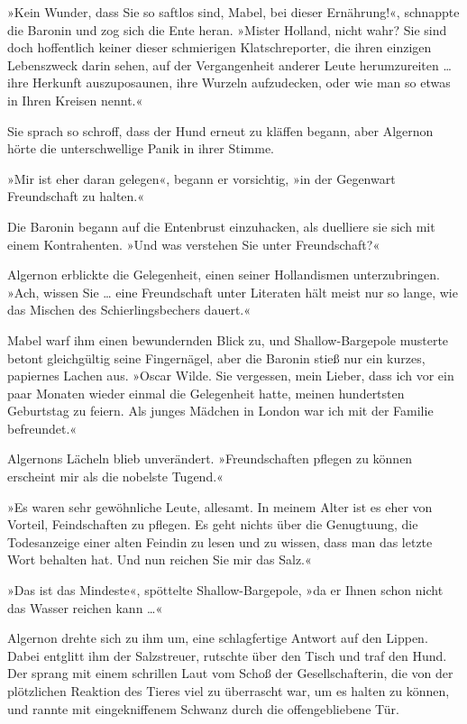 »Kein Wunder, dass Sie so saftlos sind, Mabel, bei dieser
Ernährung!«, schnappte die Baronin und zog sich die Ente heran.
»Mister Holland, nicht wahr? Sie sind doch hoffentlich keiner
dieser schmierigen Klatschreporter, die ihren einzigen Lebenszweck
darin sehen, auf der Vergangenheit anderer Leute herumzureiten \ldots{}
ihre Herkunft auszuposaunen, ihre Wurzeln aufzudecken, oder wie man
so etwas in Ihren Kreisen nennt.«

Sie sprach so schroff, dass der Hund erneut zu kläffen begann, aber
Algernon hörte die unterschwellige Panik in ihrer Stimme.

»Mir ist eher daran gelegen«, begann er vorsichtig, »in der
Gegenwart Freundschaft zu halten.«

Die Baronin begann auf die Entenbrust einzuhacken, als duelliere
sie sich mit einem Kontrahenten. »Und was verstehen Sie unter
Freundschaft?«

Algernon erblickte die Gelegenheit, einen seiner Hollandismen
unterzubringen. »Ach, wissen Sie \ldots{} eine Freundschaft unter
Literaten hält meist nur so lange, wie das Mischen des
Schierlingsbechers dauert.«

Mabel warf ihm einen bewundernden Blick zu, und Shallow-Bargepole
musterte betont gleichgültig seine Fingernägel, aber die Baronin
stieß nur ein kurzes, papiernes Lachen aus. »Oscar Wilde. Sie
vergessen, mein Lieber, dass ich vor ein paar Monaten wieder einmal
die Gelegenheit hatte, meinen hundertsten Geburtstag zu feiern. Als
junges Mädchen in London war ich mit der Familie befreundet.«

Algernons Lächeln blieb unverändert. »Freundschaften pflegen zu
können erscheint mir als die nobelste Tugend.«

»Es waren sehr gewöhnliche Leute, allesamt. In meinem Alter ist es
eher von Vorteil, Feindschaften zu pflegen. Es geht nichts über die
Genugtuung, die Todesanzeige einer alten Feindin zu lesen und zu
wissen, dass man das letzte Wort behalten hat. Und nun reichen Sie
mir das Salz.«

»Das ist das Mindeste«, spöttelte Shallow-Bargepole, »da er Ihnen
schon nicht das Wasser reichen kann \ldots{}«

Algernon drehte sich zu ihm um, eine schlagfertige Antwort auf den
Lippen. Dabei entglitt ihm der Salzstreuer, rutschte über den Tisch
und traf den Hund. Der sprang mit einem schrillen Laut vom Schoß
der Gesellschafterin, die von der plötzlichen Reaktion des Tieres
viel zu überrascht war, um es halten zu können, und rannte mit
eingekniffenem Schwanz durch die offengebliebene Tür.

